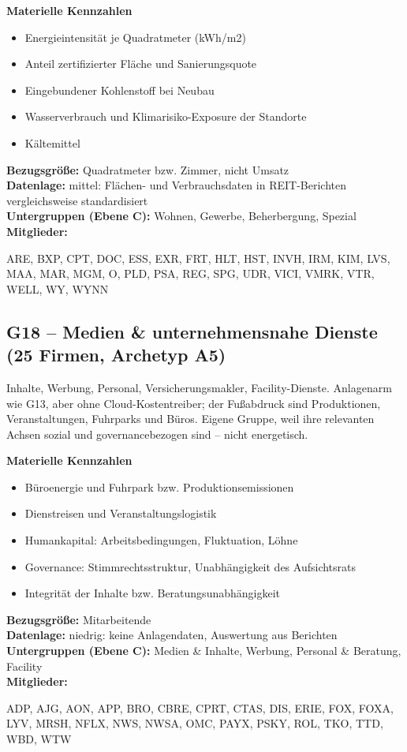 \noindent\textbf{Materielle Kennzahlen}
\begin{itemize}[nosep,leftmargin=1.2em]
  \item Energieintensität je Quadratmeter (kWh/m2)
  \item Anteil zertifizierter Fläche und Sanierungsquote
  \item Eingebundener Kohlenstoff bei Neubau
  \item Wasserverbrauch und Klimarisiko-Exposure der Standorte
  \item Kältemittel
\end{itemize}
\noindent\textbf{Bezugsgröße:} Quadratmeter bzw. Zimmer, nicht Umsatz\\
\textbf{Datenlage:} mittel: Flächen- und Verbrauchsdaten in REIT-Berichten vergleichsweise standardisiert\\
\textbf{Untergruppen (Ebene C):} Wohnen, Gewerbe, Beherbergung, Spezial\\
\textbf{Mitglieder:} {\raggedright\small\ttfamily ARE, BXP, CPT, DOC, ESS, EXR, FRT, HLT, HST, INVH, IRM, KIM, LVS, MAA, MAR, MGM, O, PLD, PSA, REG, SPG, UDR, VICI, VMRK, VTR, WELL, WY, WYNN\par}

\medskip
\subsection*{G18 -- Medien \& unternehmensnahe Dienste \normalfont\small (25 Firmen, Archetyp A5)}
\noindent Inhalte, Werbung, Personal, Versicherungsmakler, Facility-Dienste. Anlagenarm wie G13, aber ohne Cloud-Kostentreiber; der Fußabdruck sind Produktionen, Veranstaltungen, Fuhrparks und Büros. Eigene Gruppe, weil ihre relevanten Achsen sozial und governancebezogen sind -- nicht energetisch.

\noindent\textbf{Materielle Kennzahlen}
\begin{itemize}[nosep,leftmargin=1.2em]
  \item Büroenergie und Fuhrpark bzw. Produktionsemissionen
  \item Dienstreisen und Veranstaltungslogistik
  \item Humankapital: Arbeitsbedingungen, Fluktuation, Löhne
  \item Governance: Stimmrechtsstruktur, Unabhängigkeit des Aufsichtsrats
  \item Integrität der Inhalte bzw. Beratungsunabhängigkeit
\end{itemize}
\noindent\textbf{Bezugsgröße:} Mitarbeitende\\
\textbf{Datenlage:} niedrig: keine Anlagendaten, Auswertung aus Berichten\\
\textbf{Untergruppen (Ebene C):} Medien \& Inhalte, Werbung, Personal \& Beratung, Facility\\
\textbf{Mitglieder:} {\raggedright\small\ttfamily ADP, AJG, AON, APP, BRO, CBRE, CPRT, CTAS, DIS, ERIE, FOX, FOXA, LYV, MRSH, NFLX, NWS, NWSA, OMC, PAYX, PSKY, ROL, TKO, TTD, WBD, WTW\par}
